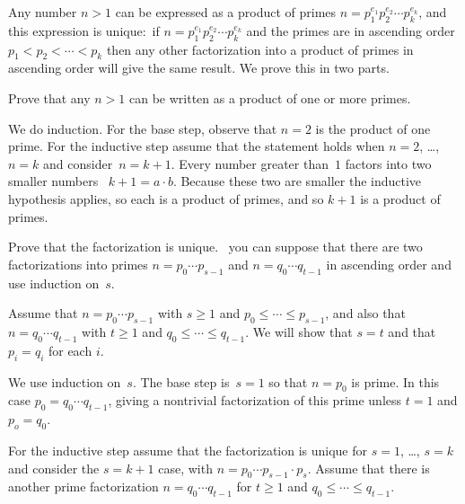 \documentclass{ibl}  %
\begin{document}
\begin{problem}   
  Any number $n>1$ can be expressed as a product of primes
  $n=p_1^{e_1}p_2^{e_2}\cdots p_k^{e_k}$, and this expression is 
  unique:~if 
  $n=p_1^{e_1}p_2^{e_2}\cdots p_k^{e_k}$ and the primes
  are in ascending order $p_1<p_2<\cdots<p_k$ then any other
  factorization into a product of primes in ascending order will give the
  same result. 
  We prove this in two parts.
\begin{exes}
\begin{exercise} 
  Prove that any $n>1$ can be written as a product of one or more primes.
\end{exercise}
\begin{answer}
  We do induction.
  For the base step, observe that $n=2$ is the product of one prime. 
  For the inductive step assume that the statement holds when $n=2$, \ldots, 
  $n=k$ and consider~$n=k+1$.
  Every number greater than~$1$ factors into two smaller numbers \
  $k+1=a\cdot b$.
  Because these two are smaller
  the inductive hypothesis applies, so each is a product of 
  primes, and so
  $k+1$ is a product of primes.  
\end{answer}
\begin{exercise} 
  Prove that the factorization is unique.
  \hint~you can suppose that there are two factorizations into primes 
   $n=p_0\cdots p_{s-1}$ and $n=q_0\cdots q_{t-1}$ in ascending order 
   and use induction on~$s$.
\end{exercise}
\begin{answer}
  Assume that $n=p_0\cdots p_{s-1}$ with $s\geq 1$ and
  $p_0\leq\cdots \leq p_{s-1}$, 
  and also that $n=q_0\cdots q_{t-1}$ with $t\geq 1$ 
  and $q_0\leq\cdots \leq q_{t-1}$.
  We will show that $s=t$ and that $p_i=q_i$ for each $i$.

  We use induction on~$s$.
  The base step is~$s=1$ so that $n=p_0$ is prime.
  In this case $p_0=q_0\cdots q_{t-1}$, giving a nontrivial factorization of 
  this prime unless $t=1$ and $p_o=q_0$.

  For the inductive step assume that the factorization is unique for
  $s=1$, \ldots, $s=k$ and consider the $s=k+1$ case, with
  $n=p_0\cdots p_{s-1}\cdot p_s$.   
  Assume that there is another prime factorization $n=q_0\cdots q_{t-1}$
  for $t\geq 1$ and $q_0\leq\cdots \leq q_{t-1}$.


\end{answer}
\end{exes}
\end{problem}
\end{document}

